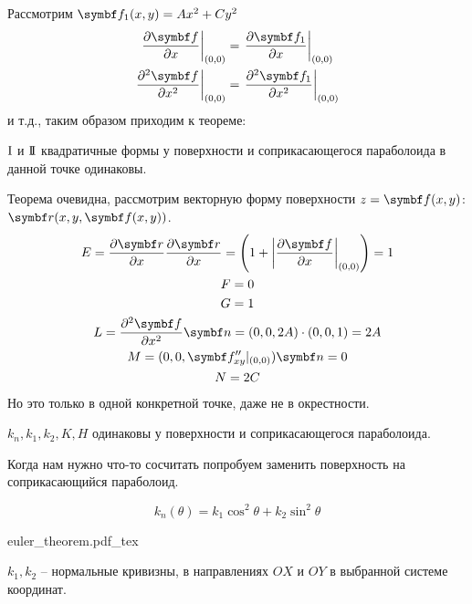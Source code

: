 \documentclass[main]{subfiles}
\begin{document}
Рассмотрим $\vf_1(x,y) = Ax^2 + Cy^2$
\begin{gather*}
    \left.\frac{\partial \vf}{\partial x} \right| _{(0,0)} = \left.\frac{\partial \vf_1}{\partial x} \right|_{(0,0)}\\
    \left.\frac{\partial^2 \vf}{\partial x^2} \right|_{(0,0)} = \left.\frac{\partial^2 \vf_1}{\partial x^2} \right|_{(0,0)}
\end{gather*}
и т.д., таким образом приходим к теореме:
\begin{theorem}
    $\mathrm{I}$ и $\mathrm{I\!I}$ квадратичные формы у поверхности и соприкасающегося параболоида в данной точке одинаковы.
\end{theorem}
Теорема очевидна, рассмотрим векторную форму поверхности $z = \vf(x,y)$: $\vr(x,y,\vf(x,y))$.
\begin{gather*}
    E = \frac{\partial \vr}{\partial x} \frac{\partial \vr}{\partial x} = \left(1 + \left|\frac{\partial \vf}{\partial x} \right|_{(0,0)}\right) = 1\\
    F = 0 \\
    G= 1\\
    L = \frac{\partial^2 \vf}{\partial x^2} \vn = (0,0,2A) \cdot (0,0,1) = 2A\\
    M = (0,0,\vf''_{xy}|_{(0,0)})\vn = 0\\
    N =  2C
\end{gather*}
Но это только в одной конкретной точке, даже не в окрестности.
\begin{corollary}
    $k_{n}, k_1, k_2, K, H$ одинаковы у поверхности и соприкасающегося параболоида.
\end{corollary}

Когда нам нужно что-то сосчитать попробуем заменить поверхность на соприкасающийся параболоид.
\begin{theorem}[Эйлера]
    \[k_{n} (\theta) = k_1 \cos^2 \theta + k_2 \sin^2 \theta\]
\end{theorem}
\begin{center}
    {euler_theorem.pdf_tex}
\end{center}
$k_1, k_2$ -- нормальные кривизны, в направлениях $OX$ и $OY$ в выбранной системе координат.
\end{document}
